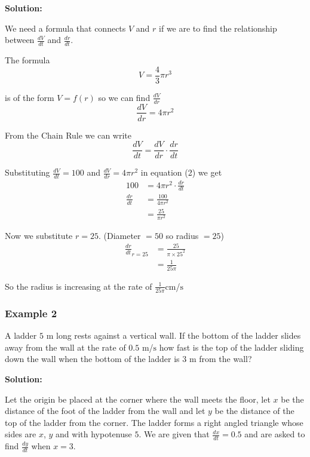 \textbf{Solution:} 

We need a formula that connects $V$ and $r$ if we are to find the relationship between $\frac{d V}{d t}$ and $\frac{d r}{d t}$. 

The formula
\begin{equation*}V =\frac{4}{3} \pi  r^{3}
\end{equation*}

is of the form $V =f (r)$ so we can find $\frac{d V}{d r}$
\begin{equation}\frac{d V}{d r} =4 \pi  r^{2}\tag{1}
\end{equation}

From the Chain Rule we can write
\begin{equation}\frac{d V}{d t} =\frac{d V}{d r} \cdot \frac{d r}{d t}\tag{2}
\end{equation}

Substituting $\frac{d V}{d t} =100$ and $\frac{d V}{d r} =4 \pi  r^{2}$ in equation (2) we get
\begin{align*}100 &  = 4 \pi  r^{2} \cdot \frac{d r}{d t} \\
\frac{d r}{d t} &  = \frac{100}{4 \pi  r^{2}} \\
 &  = \frac{25}{\pi  r^{2}}\end{align*}

Now we substitute $r =25$. (Diameter $ =50$ so radius $ =25$)
\begin{align*}\frac{d r}{d t}_{r =25} &  = \frac{25}{\pi  \times 25^{2}} \\
 &  = \frac{1}{25 \pi }\end{align*}

So the radius is increasing at the rate of $\frac{1}{25 \pi } \mbox{cm}$/$\mbox{s}$ 

\subsubsection{Example 2}
A ladder $5$ $\mbox{m}$ long rests against a vertical wall. If
the bottom of the ladder slides away from the wall at the rate of $0.5$ $\mbox{m}$/$\mbox{s}$ how fast is the top of the ladder sliding down the wall when the bottom
of the ladder is $3$ $\mbox{m}$ from the wall? 

\textbf{Solution:} 

Let the origin be placed at the corner where the wall meets the floor, let $x$ be the distance of the foot of the ladder from the wall and let $y$ be the distance of the top of the ladder from the corner. The ladder forms a right
angled triangle whose sides are $x$, $y$ and with hypotenuse $5$. We are given that $\frac{d x}{d t} =0.5$ and are asked to find $\frac{d y}{d t}$ when $x =3$. 

